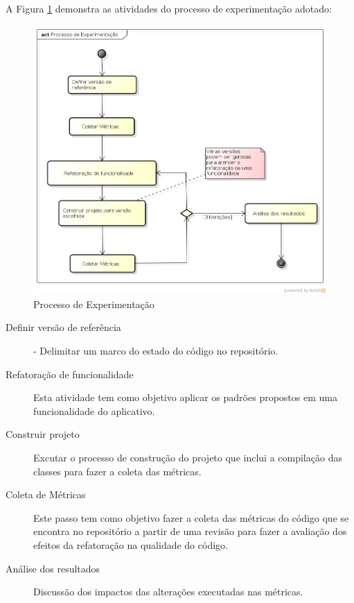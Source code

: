 A Figura \ref{processo_experimentacao} demonstra as atividades do processo de
experimentação adotado:
\begin{figure}[!htb]
	\label{processo_experimentacao}
	\caption{Processo de Experimentação}
	\begin{center}
	\includegraphics[scale=0.4]{img/processo_experimentacao.png}
	\end{center}
\end{figure}


\begin{description}
\item[Definir versão de referência] - Delimitar um marco do estado do código no
repositório.
\item[Refatoração de funcionalidade] Esta atividade tem como objetivo aplicar os
padrões propostos em uma funcionalidade do aplicativo.
\item[Construir projeto] Excutar o processo de construção do projeto que inclui
a compilação das classes para fazer a coleta das métricas.
\item[Coleta de Métricas] Este passo tem como objetivo fazer a coleta
das métricas do código que se encontra no repositório a partir de uma revisão
para fazer a avaliação dos efeitos da refatoração na qualidade do código.
\item[Análise dos resultados] Discussão dos impactos das alterações executadas
nas métricas.
\end{description}


